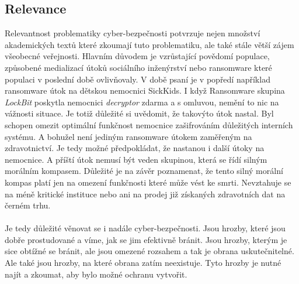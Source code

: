 \paragraph{}





\subsection{Relevance}
Relevantnost problematiky cyber-bezpečnosti potvrzuje nejen množství akademických textů které zkoumají tuto problematiku, ale také stále větší zájem všeobecné veřejnosti.
Hlavním důvodem je vzrůstající povědomí populace, způsobené medializací útoků sociálního inženýrství nebo ransomware které populaci v poslední době ovlivňovaly.
V době psaní je v popředí například ransomware útok na dětskou nemocnici SickKids.\cite{bleep_sickkids_ransom}
I když Ransomware skupina \textit{LockBit} poskytla nemocnici \textit{decryptor} zdarma a s omluvou, nemění to nic na vážnosti situace.
Je totiž důležité si uvědomit, že takovýto útok nastal.
Byl schopen omezit optimální funkčnost nemocnice zašifrováním důležitých interních systému.
A bohužel není jediným ransomware útokem zaměřeným na zdravotnictví.
Je tedy možné předpokládat, že nastanou i další útoky na nemocnice.
A příští útok nemusí být veden skupinou, která se řídí silným morálním kompasem.
Důležité je na závěr poznamenat, že tento silný morální kompas platí jen na omezení funkčnosti které může vést ke smrti.
Nevztahuje se na méně kritické instituce nebo ani na prodej již získaných zdravotních dat na černém trhu.

\paragraph{}
Je tedy důležité věnovat se i nadále cyber-bezpečnosti.
Jsou hrozby, které jsou dobře prostudované a víme, jak se jim efektivně bránit.
Jsou hrozby, kterým je sice obtížné se bránit, ale jsou omezené rozsahem a tak je obrana uskutečnitelné.
Ale také jsou hrozby, na které obrana zatím neexistuje.
Tyto hrozby je nutné najít a zkoumat, aby bylo možné ochranu vytvořit.

